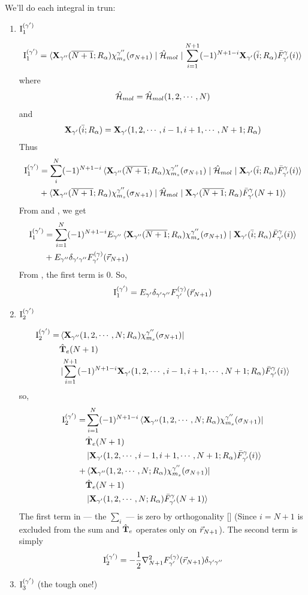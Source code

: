 \documentclass[aps,pra,groupedaddress,12pt,
               amsfonts,amssymb,
               preprint
    ]{revtex4}
\begin{document}
We'll do each integral in trun:
\begin{enumerate}
\item $\I_1^{(\gamma')}$

\begin{equation*}
  \I_1^{(\gamma')} =
  \matrixelement{\mwgg\swgg}{\Ham_{mol}}{\sum_{i=1}^{N+1}(-1)^{N+1-i}\mwgb\scf}
\end{equation*}
where
\begin{equation*}
  \Ham_{mol} = \Ham_{mol}(\oneton)
\end{equation*}
and
\begin{equation*}
  \mwgb = \mwga
\end{equation*}
Thus
\begin{align*}
    \I_1^{(\gamma')} &= \sum_i^N(-1)^{N+1-i}  
                       \matrixelement{\mwgg\swgg}{\Ham_{mol}}{\mwgb\scf} \\
                    &+ \matrixelement{\mwgg\swgg}{\Ham_{mol}}{\mwgn\scfn}
\end{align*}
From  and , we get
\begin{align*}
    \I_1^{(\gamma')} &= \sum_{i=1}^N(-1)^{N+1-i}E_{\gamma''}
                       \matrixelementa{\mwgg\swgg}{\mwgb\scf} \\
                    &+ E_{\gamma''}\dgg\sofn
\end{align*}
From , the first term is 0. So,
\begin{equation}
  \label{eq:intg1}
  \I_1^{(\gamma')} = E_{\gamma'}\dgg\sofn
\end{equation}
\item  $\I_2^{(\gamma')}$

  \begin{align*}
    \I_2^{(\gamma')} = &
    \bra{\mw_{\gamma''}\onetonRa\swgg} \\
    & \The(N+1) \\
    &\ket{\sum_{i=1}^{N+1}(-1)^{N+1-i}\mwga\scf}
  \end{align*}
so,
\begin{equation}
  \label{eq:intg2a}
  \begin{split}
    \I_2^{(\gamma')} =&
    \sum_{i=1}^N(-1)^{N+1-i}\bra{\mw_{\gamma''}\onetonRa\swgg} \\
    & \The(N+1) \\
    &\ket{\mwga\scf} \\
    +& \bra{\mw_{\gamma''}\onetonRa\swgg} \\
    & \The(N+1) \\
    &\ket{\mwg\scfn}
  \end{split}
\end{equation}
The first term in  --- the $\sum_i$ --- is zero by
orthogonality [] (Since $i=N+1$ is excluded from the sum and
$\The$ operates only on $\vrnone$). The second term is simply
\begin{equation}
  \label{eq:intg2}
  \I_2^{(\gamma')} = -\oneover{2}\lap_{N+1}\sofn\dgg
\end{equation}
\item  $\I_3^{(\gamma')}$ (the tough one!)


\end{enumerate}
\end{document}
